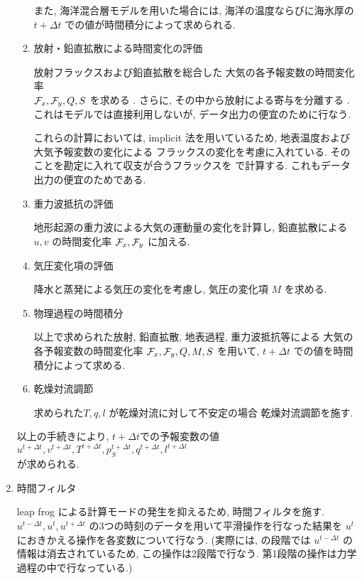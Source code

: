 \begin{enumerate}
\begin{enumerate}
また, 海洋混合層モデルを用いた場合には,
海洋の温度ならびに海氷厚の 
$t+\Delta t$ での値が時間積分によって求められる.

\item 放射・鉛直拡散による時間変化の評価 

放射フラックスおよび鉛直拡散を総合した
大気の各予報変数の時間変化率 \\
${\cal F}_x, {\cal F}_y, Q, S$ を求める .
さらに, その中から放射による寄与を分離する .
これはモデルでは直接利用しないが,
データ出力の便宜のために行なう.

これらの計算においては, implicit 法を用いているため,
地表温度および大気予報変数の変化による
フラックスの変化を考慮に入れている.
そのことを勘定に入れて収支が合うフラックスを
  で計算する.
これもデータ出力の便宜のためである.

\item 重力波抵抗の評価 

地形起源の重力波による大気の運動量の変化を計算し,
鉛直拡散による $u, v$ の時間変化率
${\cal F}_x, {\cal F}_y$ に加える.

\item 気圧変化項の評価 

降水と蒸発による気圧の変化を考慮し,
気圧の変化項 $M$ を求める.

\item 物理過程の時間積分 

以上で求められた放射, 鉛直拡散, 地表過程, 重力波抵抗等による
大気の各予報変数の時間変化率
${\cal F}_x, {\cal F}_y, Q, M, S$ を用いて,
$t+\Delta t$ での値を時間積分によって求める.

\item 乾燥対流調節 

求められた$T, q, l$ が乾燥対流に対して不安定の場合
乾燥対流調節を施す.

\end{enumerate}

以上の手続きにより,
$t+\Delta t$での予報変数の値 \\
$u^{t+\Delta t}, v^{t+\Delta t}, 
T^{t+\Delta t}, p_S^{t+\Delta t}, 
q^{t+\Delta t}, l^{t+\Delta t}$  \\
が求められる.

\item 時間フィルタ 

leap frog による計算モードの発生を抑えるため,
時間フィルタを施す.
$u^{t-\Delta t}, u^{t}, u^{t+\Delta t}$ 
の3つの時刻のデータを用いて平滑操作を行なった結果を
$u^{t}$ におきかえる操作を各変数について行なう.
(実際には,  の段階では
$u^{t-\Delta t}$ の情報は消去されているため,
この操作は2段階で行なう.
第1段階の操作は力学過程の中で行なっている.)

\end{enumerate}
